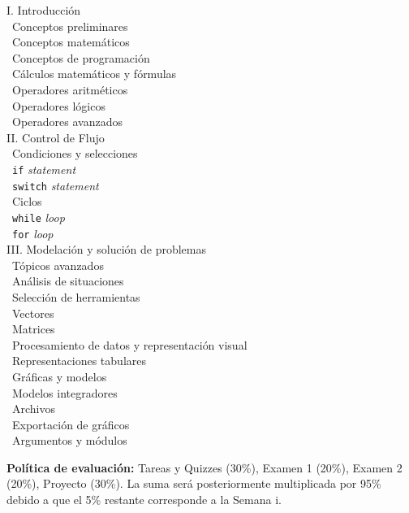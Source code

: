 \documentclass[12pt, letterpaper, oneside]{article}
\newcommand{\topic}{{\color{darkgreen}{\Rectangle}}}
\newcommand{\subtopic}{{\enskip \color{darkblue}{\Rectangle}}}
\begin{document}
  \begin{center} 
  \begin{minipage}{5in}
  \begin{flushleft}
  {\large I. Introducción} \\[2ex]
  \topic ~Conceptos preliminares \\
  \subtopic ~Conceptos matemáticos \\
  \subtopic ~Conceptos de programación \\
  \topic ~Cálculos matemáticos y fórmulas \\
  \subtopic ~Operadores aritméticos \\
  \subtopic ~Operadores lógicos \\
  \subtopic ~Operadores avanzados \\[2.5ex]
  {\large II. Control de Flujo } \\[2ex]
  \topic ~Condiciones y selecciones \\
  \subtopic ~\texttt{if} \textit{statement} \\
  \subtopic ~\texttt{switch} \textit{statement} \\
  \topic ~Ciclos \\
  \subtopic ~\texttt{while} \textit{loop} \\
  \subtopic ~\texttt{for} \textit{loop}\\[2.5ex]
  {\large III. Modelación y solución de problemas} \\[2ex]
  \topic ~Tópicos avanzados \\
  \subtopic ~Análisis de situaciones \\
  \subtopic ~Selección de herramientas \\
  \subtopic ~Vectores \\
  \subtopic ~Matrices \\
  \topic ~Procesamiento de datos y representación visual \\
  \subtopic ~Representaciones tabulares \\
  \subtopic ~Gráficas y modelos \\
  \topic ~Modelos integradores \\
  \subtopic ~Archivos \\
  \subtopic ~Exportación de gráficos \\
  \subtopic ~Argumentos y módulos
  \end{flushleft}
  \end{minipage}
  \end{center}

  \vspace*{.15in}
  \noindent\textbf{Política de evaluación:}
  Tareas y Quizzes (30\%), Examen 1 (20\%), Examen 2 (20\%), Proyecto (30\%).
  La suma será posteriormente multiplicada por 95\% debido a que el 5\% restante corresponde a la Semana i.
\end{document}
